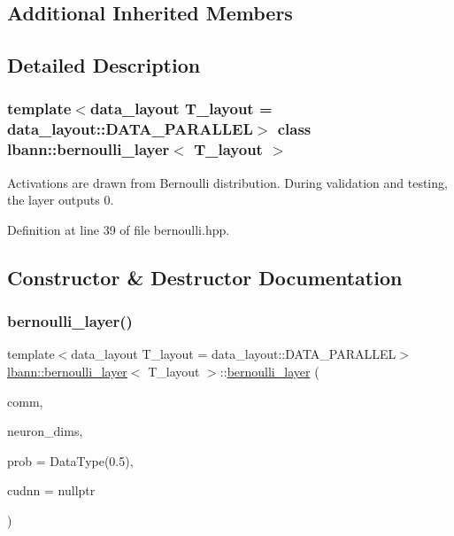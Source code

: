 \subsection*{Additional Inherited Members}


\subsection{Detailed Description}
\subsubsection*{template$<$data\+\_\+layout T\+\_\+layout = data\+\_\+layout\+::\+D\+A\+T\+A\+\_\+\+P\+A\+R\+A\+L\+L\+EL$>$\newline
class lbann\+::bernoulli\+\_\+layer$<$ T\+\_\+layout $>$}

Activations are drawn from Bernoulli distribution. During validation and testing, the layer outputs 0. 

Definition at line 39 of file bernoulli.\+hpp.



\subsection{Constructor \& Destructor Documentation}
\mbox{\label{classlbann_1_1bernoulli__layer_a59ea36ca262436f918f06cf3ea43d999}} 
\subsubsection{\texorpdfstring{bernoulli\+\_\+layer()}{bernoulli\_layer()}}
{\footnotesize\ttfamily template$<$data\+\_\+layout T\+\_\+layout = data\+\_\+layout\+::\+D\+A\+T\+A\+\_\+\+P\+A\+R\+A\+L\+L\+EL$>$ \\
\hyperlink{classlbann_1_1bernoulli__layer}{lbann\+::bernoulli\+\_\+layer}$<$ T\+\_\+layout $>$\+::\hyperlink{classlbann_1_1bernoulli__layer}{bernoulli\+\_\+layer} (\begin{DoxyParamCaption}\item[{\hyperlink{classlbann_1_1lbann__comm}{lbann\+\_\+comm} $\ast$}]{comm,  }\item[{const std\+::vector$<$ int $>$ \&}]{neuron\+\_\+dims,  }\item[{Data\+Type}]{prob = {\ttfamily DataType(0.5)},  }\item[{\hyperlink{classlbann_1_1cudnn_1_1cudnn__manager}{cudnn\+::cudnn\+\_\+manager} $\ast$}]{cudnn = {\ttfamily nullptr} }\end{DoxyParamCaption})\hspace{0.3cm}{\ttfamily [inline]}}



